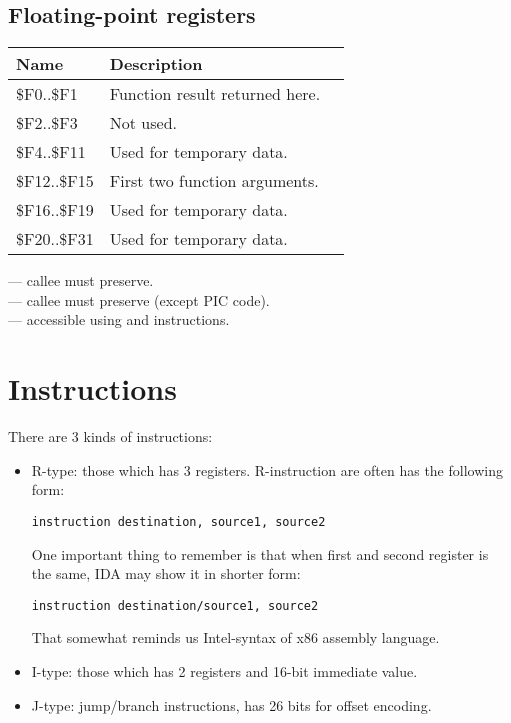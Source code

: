 \subsection{Floating-point registers}
\label{MIPS_FPU_registers}

\begin{center}
\begin{tabular}{ | l | l | l | }
\hline
\cellcolor{blue!25} Name & \cellcolor{blue!25} Description \\
\hline
\$F0..\$F1   & Function result returned here. \\
\hline
\$F2..\$F3   & Not used. \\
\hline
\$F4..\$F11  & Used for temporary data. \\
\hline
\$F12..\$F15 & First two function arguments. \\
\hline
\$F16..\$F19 & Used for temporary data. \\
\hline
\$F20..\$F31 & Used for temporary data\AsteriskOne{}. \\
\hline
\end{tabular}
\end{center}

\AsteriskOne{} --- \Gls{callee} must preserve.\\
\AsteriskTwo{} --- \Gls{callee} must preserve (except \ac{PIC} code).\\
\AsteriskThree{} --- accessible using  and  instructions.\\

\section{Instructions}

There are 3 kinds of instructions:

\begin{itemize}

\item R-type: those which has 3 registers.
R-instruction are often has the following form:

\begin{lstlisting}
instruction destination, source1, source2
\end{lstlisting}

One important thing to remember is that when first and second register is the same, 
IDA may show it in shorter form:

\begin{lstlisting}
instruction destination/source1, source2
\end{lstlisting}

That somewhat reminds us Intel-syntax of x86 assembly language.

\item I-type: those which has 2 registers and 16-bit immediate value.
\item J-type: jump/branch instructions, has 26 bits for offset encoding.

\end{itemize}

